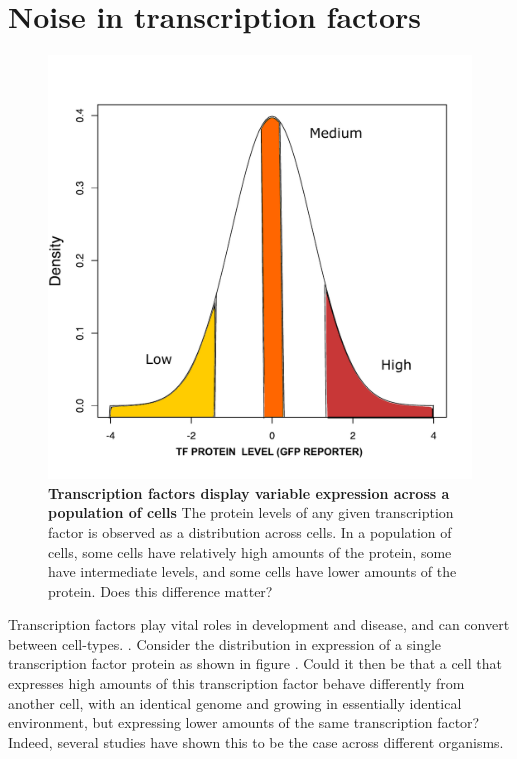 \section{Noise in transcription factors}

\begin{figure}[t!]  
    \centering
    \includegraphics[width=\linewidth, scale=0.25]{figures/intro/intro_gfp_density_X.pdf}
    \caption[Transcription factors display variable expression across a population of cells]{%
        \textbf{Transcription factors display variable expression across a population of cells}
        The protein levels of any given transcription factor is observed as a distribution across cells. In a population of cells, some cells have relatively high amounts of the protein, some have intermediate levels, and some cells have lower amounts of the protein. Does this difference matter?
    }
    \label{fig:intro2}
\end{figure}

Transcription factors play vital roles in development and disease, and can convert between cell-types. \cite{weirauch2011ahotf} \cite{levine2003n}. Consider the distribution in expression of a single transcription factor protein as shown in figure . Could it then be that a cell that expresses high amounts of this transcription factor behave differently from another cell, with an identical genome and growing in essentially identical environment, but expressing lower amounts of the same transcription factor? Indeed, several studies have shown this to be the case across different organisms.

